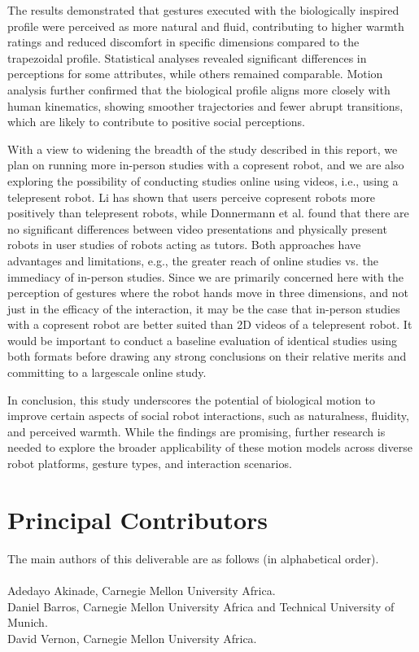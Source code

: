 \documentclass{CSSRforAfrica}
\newcommand{\blank}{~\\}
\begin{document}
The results demonstrated that gestures executed with the biologically inspired profile were perceived as more natural and fluid, contributing to higher warmth ratings and reduced discomfort in specific dimensions compared to the trapezoidal profile. Statistical analyses revealed significant differences in perceptions for some attributes, while others remained comparable. Motion analysis further confirmed that the biological profile aligns more closely with human kinematics, showing smoother trajectories and fewer abrupt transitions, which are likely to contribute to positive social perceptions.

With a view to widening the breadth of the study described in this report, we plan on running more in-person studies with a copresent robot, and we are also exploring the possibility of conducting studies online using videos, i.e., using a telepresent robot. Li \cite{Li2015} has shown that users perceive copresent robots more positively than telepresent robots, while Donnermann et al. \cite{Donnermannetal2024}  found that there are no significant differences between video presentations and physically present robots in user studies of robots acting as tutors. Both approaches have advantages and limitations, e.g., the greater reach of online studies vs. the immediacy of in-person studies.  Since we are primarily concerned here with the perception of gestures where the robot hands move in three dimensions, and not just in the efficacy of the interaction, it may be the case that in-person studies with a copresent robot are better suited than 2D videos of a telepresent robot.  It would be important to conduct a baseline evaluation of identical studies using both formats before drawing any strong conclusions on their relative merits and committing to a largescale online study.

In conclusion, this study underscores the potential of biological motion to improve certain aspects of social robot interactions, such as naturalness, fluidity, and perceived warmth. While the findings are promising, further research is needed to explore the broader applicability of these motion models across diverse robot platforms, gesture types, and interaction scenarios.



               

 

\pagebreak
\section*{Principal Contributors}
\label{contributors}
The main authors of this deliverable are as follows (in alphabetical order).
\blank
~
\blank
Adedayo Akinade, Carnegie Mellon University Africa.\\
Daniel Barros, Carnegie Mellon University Africa and Technical University of Munich. \\
David Vernon, Carnegie Mellon University Africa.\\   
  
\end{document}
